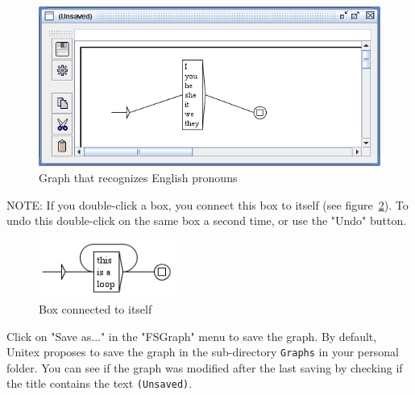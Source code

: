 \begin{figure}[!ht]
\begin{center}
\includegraphics[width=12.5cm]{resources/img/fig5-5.png}
\caption{Graph that recognizes English
pronouns\label{fig-pronoun-graph}}
\end{center}
\end{figure}
\pagebreak
\bigskip
\noindent NOTE: If you double-click a box, you connect this box to itself (see
figure~\ref{fig-loop-box}). To undo this double-click on the
same box a second time, or use the "Undo" button.

\bigskip
\begin{figure}[!h]
\begin{center}
\includegraphics[width=4.5cm]{resources/img/fig5-6.png}
\caption{Box connected to itself\label{fig-loop-box}}
\end{center}
\end{figure}

\noindent Click on "Save as..." in the "FSGraph" menu to save the graph.
 By default, Unitex proposes to save the graph in the
sub-directory \verb+Graphs+ in your personal folder. You can see if the 
graph was modified after the last
saving by checking if the title contains the text \verb+(Unsaved)+.

